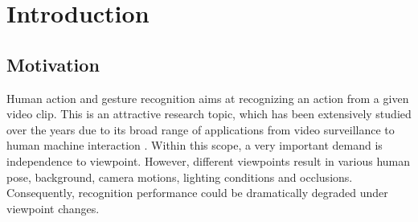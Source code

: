 
\chapter{Introduction} \label{chap:introduction}
    \section{Motivation} \label{sec:intro_motivation}
        Human action and gesture recognition aims at recognizing an action from a given video clip. This is an attractive research topic, which has been extensively studied over the years due to its broad range of applications from video surveillance to human machine interaction \cite{herath2017going, zhang2019comprehensive}.
        Within this scope, a very important demand is independence to viewpoint. However, different viewpoints result in various human pose, background, camera motions, lighting conditions and occlusions. Consequently, recognition performance could be dramatically degraded under viewpoint changes.

